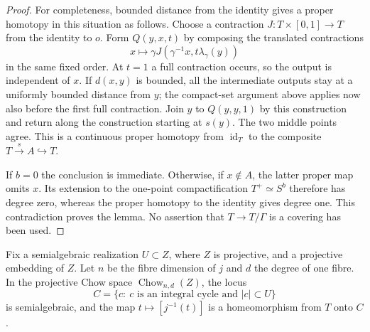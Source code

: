 \begin{proof}
For completeness, bounded distance from the identity gives a proper
homotopy in this situation as follows.  Choose a contraction
$J:T\times[0,1]\to T$ from the identity to $o$.  Form $Q(y,x,t)$
by composing the translated contractions
\[
       x\longmapsto\gamma J(\gamma^{-1}x,t\lambda_\gamma(y))
\]
in the same fixed order.  At $t=1$ a full contraction occurs, so the
output is independent of $x$.  If $d(x,y)$ is bounded, all the
intermediate outputs stay at a uniformly bounded distance from $y$;
the compact-set argument above applies now also before the first
full contraction.  Join $y$ to $Q(y,y,1)$ by this construction and
return along the construction starting at $s(y)$.  The two middle
points agree.  This is a continuous proper homotopy from
$\operatorname{id}_T$ to the composite $T\xrightarrow{s}A\hookrightarrow T$.

If $b=0$ the conclusion is immediate.  Otherwise, if $x\notin A$,
the latter proper map omits $x$.  Its extension to the one-point
compactification $T^+\simeq S^b$ therefore has degree zero, whereas
the proper homotopy to the identity gives degree one.  This
contradiction proves the lemma.  No assertion that $T\to T/\Gamma$
is a covering has been used.
\end{proof}

\begin{lemma}
\label{cmp:chow-base}
Fix a semialgebraic realization $U\subset Z$, where $Z$ is projective,
and a projective embedding of $Z$.  Let $n$ be the fibre dimension of
$j$ and $d$ the degree of one fibre.  In the projective Chow space
$\operatorname{Chow}_{n,d}(Z)$, the locus
\[
 C=\{c:\ c\text{ is an integral cycle and }|c|\subset U\}
\]
is semialgebraic, and the map $t\mapsto[j^{-1}(t)]$ is a homeomorphism
from $T$ onto $C$.
\end{lemma}

